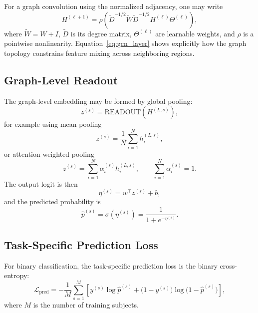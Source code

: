 For a graph convolution using the normalized adjacency, one may write
\begin{equation}
\label{eq:gcn_layer}
H^{(\ell+1)}
=
\rho\!\left(
\widetilde D^{-1/2}\widetilde W \widetilde D^{-1/2}
H^{(\ell)} \Theta^{(\ell)}
\right),
\end{equation}
where \(\widetilde W = W + I\), \(\widetilde D\) is its degree matrix, \(\Theta^{(\ell)}\) are learnable weights, and \(\rho\) is a pointwise nonlinearity. Equation~\eqref{eq:gcn_layer} shows explicitly how the graph topology constrains feature mixing across neighboring regions.

\subsection{Graph-Level Readout}

The graph-level embedding may be formed by global pooling:
\begin{equation}
z^{(s)} = \mathrm{READOUT}(H^{(L,s)}),
\end{equation}
for example using mean pooling
\begin{equation}
z^{(s)} = \frac{1}{N}\sum_{i=1}^{N} h_i^{(L,s)},
\end{equation}
or attention-weighted pooling
\begin{equation}
z^{(s)} = \sum_{i=1}^{N}\alpha_i^{(s)} h_i^{(L,s)}, \qquad
\sum_{i=1}^{N}\alpha_i^{(s)}=1.
\end{equation}
The output logit is then
\begin{equation}
\eta^{(s)} = w^\top z^{(s)} + b,
\end{equation}
and the predicted probability is
\begin{equation}
\hat p^{(s)} = \sigma(\eta^{(s)}) = \frac{1}{1+e^{-\eta^{(s)}}}.
\end{equation}

\subsection{Task-Specific Prediction Loss}

For binary classification, the task-specific prediction loss is the binary cross-entropy:
\begin{equation}
\label{eq:bce_loss}
\mathcal{L}_{\mathrm{pred}}
=
-\frac{1}{M}\sum_{s=1}^{M}
\left[
y^{(s)}\log \hat p^{(s)} + \big(1-y^{(s)}\big)\log\big(1-\hat p^{(s)}\big)
\right],
\end{equation}
where \(M\) is the number of training subjects.

